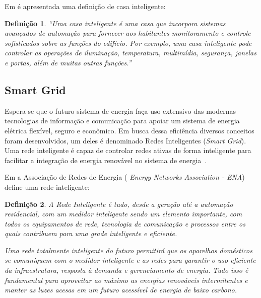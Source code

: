 \documentclass[12pt,article,compsoc]{IEEEtran}
\newtheorem{definicao}{Definição}
\begin{document}
Em \cite{smartHomeDef} é apresentada uma definição de casa inteligente: 

\begin{definicao}
“Uma casa inteligente é uma casa que incorpora sistemas avançados de automação para fornecer aos habitantes monitoramento e controle sofisticados sobre as funções do edifício. Por exemplo, uma casa inteligente pode controlar as operações de iluminação, temperatura, multimídia, segurança, janelas e portas, além de muitas outras funções.”
\end{definicao}




\subsection{Smart Grid}\label{sec:smartGrid}


Espera-se que o futuro sistema de energia faça uso extensivo das modernas tecnologias de informação e comunicação para apoiar um sistema de energia elétrica flexível, seguro e econômico. Em busca dessa eficiência diversos conceitos foram desenvolvidos, um deles é denominado Redes Inteligentes (\emph{Smart Grid}). Uma rede inteligente é capaz de controlar redes ativas de forma inteligente para facilitar a integração de energia renovável no sistema de energia~\cite{smartGridDef}.

Em \cite{smartGridDef2} a Associação de Redes de Energia (\emph{ Energy Networks Association - ENA}) define uma rede inteligente:

\begin{definicao}

A Rede Inteligente é tudo, desde a geração até a automação residencial, com um medidor inteligente sendo um elemento importante, com todos os equipamentos de rede, tecnologia de comunicação e processos entre os quais contribuem para uma grade inteligente e eficiente.

Uma rede totalmente inteligente do futuro permitirá que os aparelhos domésticos se comuniquem com o medidor inteligente e as redes para garantir o uso eficiente da infraestrutura, resposta à demanda e gerenciamento de energia. Tudo isso é fundamental para aproveitar ao máximo as energias renováveis intermitentes e manter as luzes acesas em um futuro acessível de energia de baixo carbono.

\end{definicao}
\end{document}
